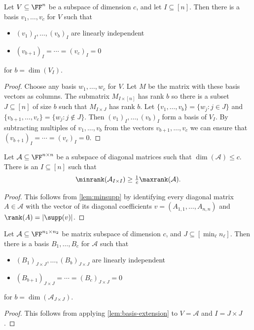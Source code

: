 \begin{lemma}\label{lem:basis-extension}
    Let $V \subseteq \FF^n$ be a subspace of dimension $c$, and let $I \subseteq [n]$. Then there is a basis $v_1, \ldots, v_c$ for $V$ such that 
    \begin{itemize}
        \item $(v_1)_I, \ldots, (v_b)_I$ are linearly independent
        \item $(v_{b+1})_I = \cdots = (v_c)_I = 0$
    \end{itemize}
    for $b = \dim(V_I)$.
\end{lemma}
\begin{proof}
    Choose any basis $w_1, \ldots, w_c$ for $V$. Let $M$ be the matrix with these basis vectors as columns. The submatrix $M_{I \times[n]}$ has rank $b$ so there is a subset $J \subseteq [n]$ of size $b$ such that $M_{I \times J}$ has rank $b$.
    Let $\{v_1, \ldots, v_b\} = \{w_j : j \in J\}$ and $\{v_{b+1}, \ldots, v_c\} = \{w_j : j \not\in J\}$.
    Then $(v_1)_I, \ldots, (v_b)_I$ form a basis of $V_I$. By subtracting multiples of $v_1, \ldots, v_b$ from the vectors $v_{b+1}, \ldots, v_c$ we can ensure that $(v_{b+1})_I = \cdots = (v_c)_I = 0$.
\end{proof}

\begin{lemma}\label{lem:large-minrank}
    Let $\mathcal{A} \subseteq \FF^{n \times n}$ be a subspace of diagonal matrices such that $\dim(\mathcal{A}) \leq c$. There is an $I \subseteq [n]$ such that 
    \[
    \minrank(\mathcal{A}_{I\times I}) \geq \tfrac1c \maxrank(\mathcal{A}).
    \]
\end{lemma}
\begin{proof}
    This follows from \autoref{lem:minsupp} by identifying every diagonal matrix $A \in \mathcal{A}$ with the vector of its diagonal coefficients $v = (A_{1,1}, \ldots, A_{n,n})$ and $\rank(A) = |\supp(v)|$.
\end{proof}

\begin{lemma}\label{lem:basis-extension-matrices}
    Let $\mathcal{A} \subseteq \FF^{n_1 \times n_2}$ be matrix subspace of dimension $c$, and $J \subseteq [\min_\ell n_\ell]$. Then there is a basis $B_1, \ldots, B_c$ for $\mathcal{A}$ such that
    \begin{itemize}
        \item $(B_1)_{J \times J}, \ldots, (B_b)_{J \times J}$ are linearly independent
        \item $(B_{b+1})_{J \times J}= \cdots = (B_{c})_{J \times J} = 0$
    \end{itemize}
    for $b = \dim(\mathcal{A}_{J\times J})$.
\end{lemma}
\begin{proof}
This follows from applying \autoref{lem:basis-extension} to $V = \mathcal{A}$ and $I = J \times J$.
\end{proof}


